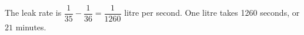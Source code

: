 The leak rate is $\dfrac{1}{35}-\dfrac{1}{36}=\dfrac{1}{1260}$ litre per second. One litre takes 1260 seconds, or $\boxed{21}$ minutes.
